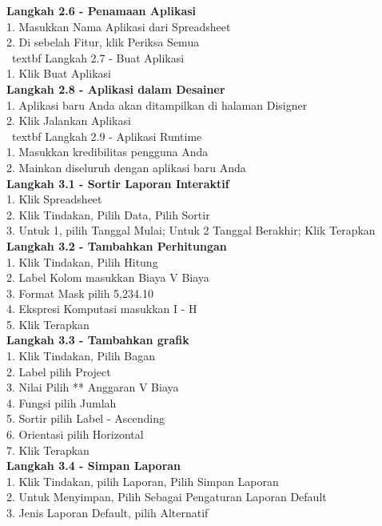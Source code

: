 \documentclass[12pt, times new roman, a4paper]{article}
\begin{document}
\textbf{Langkah 2.6 - Penamaan Aplikasi}\\
1. Masukkan Nama {Aplikasi dari Spreadsheet} \\
2. Di sebelah Fitur, klik Periksa Semua \\
\ textbf {Langkah 2.7 - Buat Aplikasi} \\
1. Klik Buat Aplikasi \\
\textbf{Langkah 2.8 - Aplikasi dalam Desainer} \\
1. Aplikasi baru Anda akan ditampilkan di halaman Disigner \\
2. Klik Jalankan Aplikasi \\
\ textbf {Langkah 2.9 - Aplikasi Runtime} \\
1. Masukkan kredibilitas pengguna Anda \\
2. Mainkan diseluruh dengan aplikasi baru Anda \\
\textbf{Langkah 3.1 - Sortir Laporan Interaktif} \\
1. Klik Spreadsheet \\
2. Klik Tindakan, Pilih Data, Pilih Sortir \\
3. Untuk 1, pilih Tanggal Mulai; Untuk 2 Tanggal Berakhir; Klik Terapkan \\
\textbf{Langkah 3.2 - Tambahkan Perhitungan} \\
1. Klik Tindakan, Pilih Hitung \\
2. Label Kolom masukkan Biaya V Biaya \\
3. Format Mask pilih  5,234.10 \\
4. Ekspresi Komputasi masukkan I - H \\
5. Klik Terapkan \\
\textbf{Langkah 3.3 - Tambahkan grafik} \\
1. Klik Tindakan, Pilih Bagan \\
2. Label pilih Project \\
3. Nilai Pilih ** Anggaran V Biaya \\
4. Fungsi pilih Jumlah \\
5. Sortir pilih Label - Ascending \\
6. Orientasi pilih Horizontal \\
7. Klik Terapkan \\
\textbf{Langkah 3.4 - Simpan Laporan} \\
1. Klik Tindakan, pilih Laporan, Pilih Simpan Laporan \\
2. Untuk Menyimpan, Pilih Sebagai Pengaturan Laporan Default \\
3. Jenis Laporan Default, pilih Alternatif \\
\end{document}
